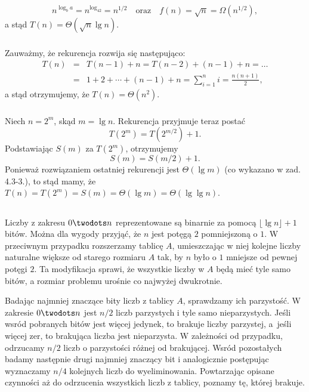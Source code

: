 \subsubsection{} %
\[
	n^{\log_ba}=n^{\log_42}=n^{1/2}\quad\mbox{oraz}\quad f(n)=\sqrt{n}=\Omega(n^{1/2}),
\]
a stąd $T(n)=\Theta\left(\sqrt{n}\lg n\right)$.

\subsubsection{} %
Zauważmy, że rekurencja rozwija się następująco:
\begin{eqnarray*}
	T(n) &=& T(n-1)+n=T(n-2)+(n-1)+n=\dots \\
	&=& 1+2+\cdots+(n-1)+n=\sum_{i=1}^ni=\frac{n(n+1)}{2},
\end{eqnarray*}
a stąd otrzymujemy, że $T(n)=\Theta(n^2)$.

\subsubsection{} %
Niech $n=2^m$, skąd $m=\lg n$. Rekurencja przyjmuje teraz postać
\[
	T(2^m) = T\left(2^{m/2}\right)+1.
\]
Podstawiając $S(m)$ za $T(2^m)$, otrzymujemy
\[
	S(m) = S(m/2)+1.
\]
Ponieważ rozwiązaniem ostatniej rekurencji jest $\Theta(\lg m)$ (co wykazano w zad. 4.3-3.), to stąd mamy, że $T(n)=T(2^m)=S(m)=\Theta(\lg m)=\Theta(\lg\lg n)$.

\subsection{} %
Liczby z zakresu $0\twodots n$ reprezentowane są binarnie za pomocą $\lfloor\lg n\rfloor+1$ bitów. Można dla wygody przyjąć, że $n$ jest potęgą $2$ pomniejszoną o $1$. W przeciwnym przypadku rozszerzamy tablicę $A$, umieszczając w niej kolejne liczby naturalne większe od starego rozmiaru $A$ tak, by $n$ było o $1$ mniejsze od pewnej potęgi $2$. Ta modyfikacja sprawi, że wszystkie liczby w $A$ będą mieć tyle samo bitów, a rozmiar problemu urośnie co najwyżej dwukrotnie.

Badając najmniej znaczące bity liczb z tablicy $A$, sprawdzamy ich parzystość. W zakresie $0\twodots n$ jest $n/2$ liczb parzystych i tyle samo nieparzystych. Jeśli wsród pobranych bitów jest więcej jedynek, to brakuje liczby parzystej, a~jeśli więcej zer, to brakująca liczba jest nieparzysta. W zależności od przypadku, odrzucamy $n/2$ liczb o parzystości różnej od brakującej. Wsród pozostałych badamy następnie drugi najmniej znaczący bit i analogicznie postępując wyznaczamy $n/4$ kolejnych liczb do wyeliminowania. Powtarzając opisane czynności aż do odrzucenia wszystkich liczb z tablicy, poznamy tę, której brakuje.

